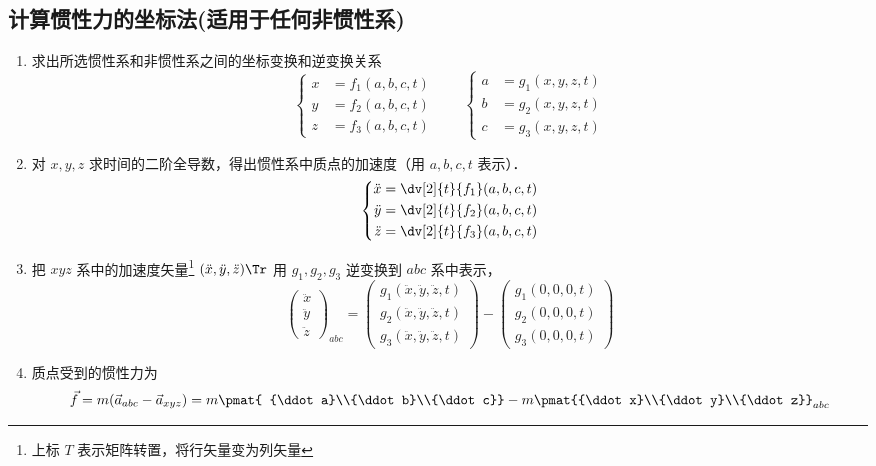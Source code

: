 \subsection{计算惯性力的坐标法(适用于任何非惯性系)}
\begin{enumerate}
\item 求出所选惯性系和非惯性系之间的坐标变换和逆变换关系
\begin{equation}
\left\{ \begin{aligned}
x &= f_1( a,b,c,t )\\
y &= f_2( a,b,c,t )\\
z &= f_3( a,b,c,t )
\end{aligned} \right.
\qquad
\left\{ \begin{aligned}
a &= g_1( x,y,z,t )\\
b &= g_2( x,y,z,t )\\
c &= g_3( x,y,z,t )
\end{aligned} \right.
\end{equation}
\item 对 $x,y,z$ 求时间的二阶全导数，得出惯性系中质点的加速度（用 $a,b,c,t$ 表示）．
\begin{equation}
\left\{ \begin{aligned}
\ddot x &= \dv[2]{t} {f_1} ( {a,b,c,t} )\\
\ddot y &= \dv[2]{t} {f_2} ( {a,b,c,t} )\\
\ddot z &= \dv[2]{t} {f_3} ( {a,b,c,t} )
\end{aligned} \right.
\end{equation}

\item 把 $xyz$ 系中的加速度矢量\footnote{上标 $T$ 表示矩阵转置，将行矢量变为列矢量} $({\ddot x},{\ddot y},{\ddot z})\Tr$ 用 $g_1,g_2,g_3$ 逆变换到 $abc$ 系中表示，
\begin{equation}
\begin{pmatrix} {\ddot x}\\{\ddot y}\\{\ddot z}\end{pmatrix}_{abc} = \begin{pmatrix} g_1(\ddot x,\ddot y,\ddot z, t)\\g_2(\ddot x,\ddot y,\ddot z, t)\\g_3(\ddot x,\ddot y,\ddot z, t)\end{pmatrix} -
\begin{pmatrix} g_1(0,0,0,t)\\g_2(0,0,0,t)\\g_3(0,0,0,t) \end{pmatrix}
\end{equation}

\item 质点受到的惯性力为
\begin{equation}\label{Iner_eq9}
\vec f = m ( {{{\vec a}_{abc}} - {{\vec a}_{xyz}}} ) = 
m\pmat{ {\ddot a}\\{\ddot b}\\{\ddot c}} - m\pmat{{\ddot x}\\{\ddot y}\\{\ddot z}}_{abc}
\end{equation}
\end{enumerate}
